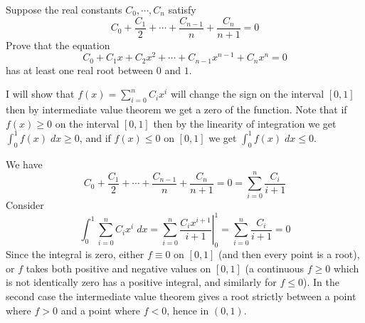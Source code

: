 \begin{problem}
Suppose the real constants $C_0,\cdots , C_n$ satisfy 
    \[C_0 + \frac{C_1}2 + \cdots + \frac{C_{n-1}}n + \frac{C_n}{n+1}= 0\]
    Prove that the equation 
    \[ C_0 + C_1 x + C_2 x^2 +\cdots + C_{n-1}x^{n-1}+ C_n x^n =0\]
    has at least one real root between $0$ and $1$.
\begin{solution}
I will show that $f(x) = \sum_{i=0}^n C_i x^i$ will change the sign on the interval $[0,1]$ then by intermediate value theorem we get a zero of the function. Note that if $f(x) \geq 0$ on the interval $[0,1]$ then by the linearity of integration we get $\int_0^1 f(x) \; dx \geq 0$, and if $f(x)\leq 0$ on $[0,1]$ we get $\int_0^1 f(x) \; dx \leq 0$.  \newline 

We have  \[C_0 + \frac{C_1}2 + \cdots + \frac{C_{n-1}}n + \frac{C_n}{n+1}= 0 = \sum_{i=0}^n \frac{C_i}{i+1}\]
    Consider $$\int_0^1 \sum_{i=0}^n C_i x^i \; dx = \left.\sum_{i=0}^n\frac{C_i x^{i+1}}{i+1}\right|_0^1 = \sum_{i=0}^n \frac{C_i}{i+1}=0 $$
    Since the integral is zero, either $f\equiv 0$ on $[0,1]$ (and then every point is a root), or $f$ takes both positive and negative values on $[0,1]$ (a continuous $f\geq 0$ which is not identically zero has a positive integral, and similarly for $f\leq 0$). In the second case the intermediate value theorem gives a root strictly between a point where $f>0$ and a point where $f<0$, hence in $(0,1)$.
\end{solution}
\end{problem}

